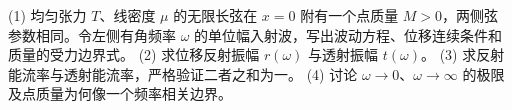 (1) 均匀张力 \(T\)、线密度 \(\mu\) 的无限长弦在 \(x=0\) 附有一个点质量 \(M>0\)，两侧弦参数相同。令左侧有角频率 \(\omega\) 的单位幅入射波，写出波动方程、位移连续条件和质量的受力边界式。
(2) 求位移反射振幅 \(r(\omega)\) 与透射振幅 \(t(\omega)\)。
(3) 求反射能流率与透射能流率，严格验证二者之和为一。
(4) 讨论 \(\omega\to0\)、\(\omega\to\infty\) 的极限及点质量为何像一个频率相关边界。
